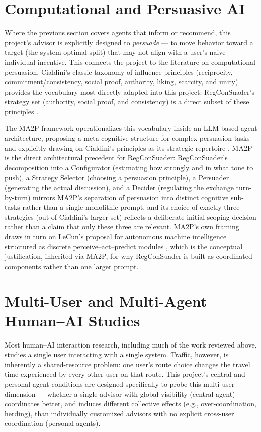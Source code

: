 \documentclass[11pt]{article}
\begin{document}
\section{Computational and Persuasive AI}
Where the previous section covers agents that inform or recommend, this project's advisor is explicitly designed to \emph{persuade} --- to move behavior toward a target (the system-optimal split) that may not align with a user's naive individual incentive. This connects the project to the literature on computational persuasion. Cialdini's classic taxonomy of influence principles (reciprocity, commitment/consistency, social proof, authority, liking, scarcity, and unity) provides the vocabulary most directly adapted into this project: RegConSuader's strategy set (authority, social proof, and consistency) is a direct subset of these principles \citep{cialdini2021}.

The MA2P framework operationalizes this vocabulary inside an LLM-based agent architecture, proposing a meta-cognitive structure for complex persuasion tasks and explicitly drawing on Cialdini's principles as its strategic repertoire \citep{zhang2024ma2p}. MA2P is the direct architectural precedent for RegConSuader: RegConSuader's decomposition into a Configurator (estimating how strongly and in what tone to push), a Strategy Selector (choosing a persuasion principle), a Persuader (generating the actual discussion), and a Decider (regulating the exchange turn-by-turn) mirrors MA2P's separation of persuasion into distinct cognitive sub-tasks rather than a single monolithic prompt, and its choice of exactly three strategies (out of Cialdini's larger set) reflects a deliberate initial scoping decision rather than a claim that only these three are relevant. MA2P's own framing draws in turn on LeCun's proposal for autonomous machine intelligence structured as discrete perceive--act--predict modules \citep{lecun2022}, which is the conceptual justification, inherited via MA2P, for why RegConSuader is built as coordinated components rather than one larger prompt.

\section{Multi-User and Multi-Agent Human--AI Studies}
Most human--AI interaction research, including much of the work reviewed above, studies a single user interacting with a single system. Traffic, however, is inherently a shared-resource problem: one user's route choice changes the travel time experienced by every other user on that route. This project's central and personal-agent conditions are designed specifically to probe this multi-user dimension --- whether a single advisor with global visibility (central agent) coordinates better, and induces different collective effects (e.g., over-coordination, herding), than individually customized advisors with no explicit cross-user coordination (personal agents).
\end{document}

